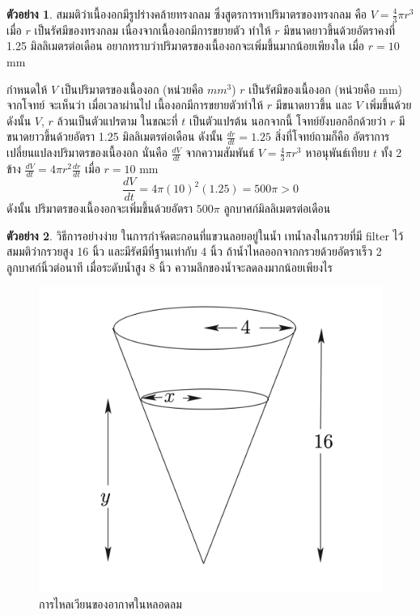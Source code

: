\documentclass[
]{book}
\theoremstyle{definition}
\theoremstyle{definition}
\newtheorem{example}{ตัวอย่าง}[chapter]
\theoremstyle{definition}
\theoremstyle{definition}
\theoremstyle{remark}
\begin{document}
\begin{example}
สมมติว่าเนื้องอกมีรูปร่างคล้ายทรงกลม ซึ่งสูตรการหาปริมาตรของทรงกลม คือ
\(\displaystyle V=\frac{4}{3}\pi r^3\) เมื่อ \(r\) เป็นรัศมีของทรงกลม
เนื่องจากเนื้องอกมีการขยายตัว ทำให้ \(r\) มีขนาดยาวขึ้นด้วยอัตราคงที่ 1.25 มิลลิเมตรต่อเดือน
อยากทราบว่าปริมาตรของเนื้องอกจะเพิ่มขึ้นมากน้อยเพียงใด เมื่อ \(r=10\) mm
\end{example}

กำหนดให้ \(V\) เป็นปริมาตรของเนื้องอก (หน่วยคือ \(mm^3\)) \(r\) เป็นรัศมีของเนื้องอก
(หน่วยคือ mm) จากโจทย์ จะเห็นว่า เมื่อเวลาผ่านไป เนื้องอกมีการขยายตัวทำให้ \(r\)
มีขนาดยาวขึ้น และ \(V\) เพิ่มขึ้นด้วย ดังนั้น \(V\), \(r\) ล้วนเป็นตัวแปรตาม ในขณะที่ \(t\)
เป็นตัวแปรต้น นอกจากนี้ โจทย์ยังบอกอีกด้วยว่า \(r\) มีขนาดยาวขึ้นด้วยอัตรา 1.25
มิลลิเมตรต่อเดือน ดังนั้น \(\displaystyle\frac{dr}{dt}=1.25\) สิ่งที่โจทย์ถามก็คือ
อัตราการเปลี่ยนแปลงปริมาตรของเนื้องอก นั่นคือ \(\displaystyle\frac{dV}{dt}\)
จากความสัมพันธ์ \(\displaystyle V=\frac{4}{3}\pi r^3\) หาอนุพันธ์เทียบ \(t\) ทั้ง 2
ข้าง \(\displaystyle\frac{dV}{dt}=4\pi r^2 \frac{dr}{dt}\) เมื่อ \(r=10\) mm
\[\frac{dV}{dt}=4\pi(10)^2 (1.25)=500\pi>0\] ดังนั้น
ปริมาตรของเนื้องอกจะเพิ่มขึ้นด้วยอัตรา \(500\pi\) ลูกบาศก์มิลลิเมตรต่อเดือน

\begin{example}
วิธีการอย่างง่าย ในการกำจัดตะกอนที่แขวนลอยอยู่ในน้ำ เทน้ำลงในกรวยที่มี filter ไว้
สมมติว่ากรวยสูง 16 นิ้ว และมีรัศมีที่ฐานเท่ากับ 4 นิ้ว ถ้าน้ำไหลออกจากกรวยด้วยอัตราเร็ว 2
ลูกบาศก์นิ้วต่อนาที เมื่อระดับน้ำสูง 8 นิ้ว ความลึกของน้ำจะลดลงมากน้อยเพียงไร
\end{example}

\begin{figure}

{\centering \includegraphics[width=0.5\linewidth]{images/fig-derivative-4} 

}

\caption{การไหลเวียนของอากาศในหลอดลม}\label{fig:fig-derivative-4}
\end{figure}
\end{document}
